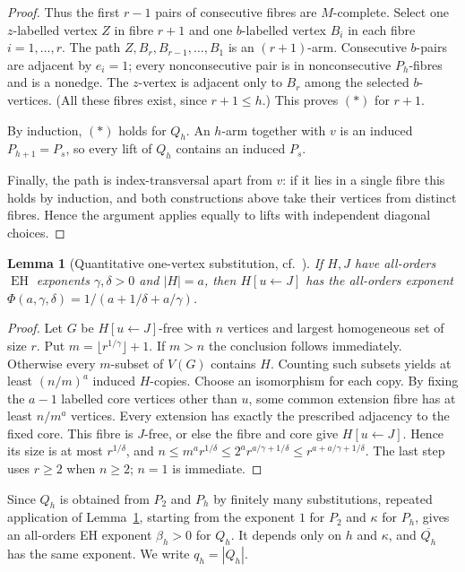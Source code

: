 \documentclass[11pt,a4paper]{article}
\newtheorem{lemma}[theorem]{Lemma}
\theoremstyle{definition}
\theoremstyle{remark}
\numberwithin{equation}{section}
\begin{document}
\begin{proof}
Thus the first \(r-1\) pairs of consecutive fibres are \(M\)-complete. Select one \(z\)-labelled vertex \(Z\) in fibre \(r+1\) and one \(b\)-labelled vertex \(B_{i}\) in each fibre \(i=1,\ldots,r\). The path \(Z,\allowbreak B_{r},\allowbreak B_{r-1},\ldots,B_{1}\) is an \((r+1)\)-arm. Consecutive \(b\)-pairs are adjacent by \(e_{i}=1\); every nonconsecutive pair is in nonconsecutive \(P_{h}\)-fibres and is a nonedge. The \(z\)-vertex is adjacent only to \(B_{r}\) among the selected \(b\)-vertices. (All these fibres exist, since \(r+1\le h\).) This proves \((\ast)\) for \(r+1\).

By induction, \((\ast)\) holds for \(Q_{h}\). An \(h\)-arm together with \(v\) is an induced \(P_{h+1}=P_{s}\), so every lift of \(Q_h\) contains an induced \(P_s\).

Finally, the path is index-transversal apart from \(v\): if it lies in a single fibre this holds by induction, and both constructions above take their vertices from distinct fibres. Hence the argument applies equally to lifts with independent diagonal choices.


\end{proof}
\begin{lemma}[Quantitative one-vertex substitution, cf.\ \cite{aps}]\label{lem:substitution}
If \(H,\allowbreak J\) have all-orders \(\operatorname{EH}\) exponents \(\gamma,\allowbreak \delta>0\) and \(|H|=a\), then \(H[u\leftarrow J]\) has the all-orders exponent \(\Phi(a,\allowbreak \gamma,\allowbreak \delta) = 1/(a+1/\delta+a/\gamma)\).
\end{lemma}\begin{proof}
Let \(G\) be \(H[u\leftarrow J]\)-free with \(n\) vertices and largest homogeneous set of size \(r\). Put \(m=\lfloor r^{1/\gamma}\rfloor+1\). If \(m>n\) the conclusion follows immediately. Otherwise every \(m\)-subset of \(V(G)\) contains \(H\). Counting such subsets yields at least \((n/m)^{a}\) induced \(H\)-copies. Choose an isomorphism for each copy. By fixing the \(a-1\) labelled core vertices other than \(u\), some common extension fibre has at least \(n/m^{a}\) vertices. Every extension has exactly the prescribed adjacency to the fixed core. This fibre is \(J\)-free, or else the fibre and core give \(H[u\leftarrow J]\). Hence its size is at most \(r^{1/\delta}\), and \(n \le\allowbreak  m^{a} r^{1/\delta} \le\allowbreak  2^{a} r^{a/\gamma+1/\delta} \le\allowbreak  r^{a+a/\gamma+1/\delta}\). The last step uses \(r\ge\allowbreak 2\) when \(n\ge\allowbreak 2\); \(n=1\) is immediate.
\end{proof}
Since \(Q_h\) is obtained from \(P_2\) and \(P_h\) by finitely many substitutions, repeated application of Lemma~\ref{lem:substitution}, starting from the exponent \(1\) for \(P_2\) and \(\kappa\) for \(P_h\), gives an all-orders EH exponent \(\beta_{h}>0\) for \(Q_{h}\). It depends only on \(h\) and \(\kappa\), and \(\overline{Q_h}\) has the same exponent. We write \(q_{h}=|Q_{h}|\).
\end{document}
